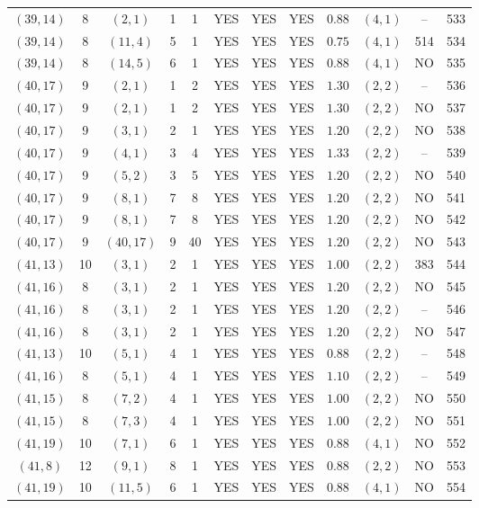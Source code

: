 \begin{longtable}{|c|c|c|c|c|c|c|c|c|c|c|c|}
$(39,14)$ & 8 & $(2,1)$ & 1 & 1 & YES & YES & YES & $0.88$ & $(4,1)$ & -- & 533\\
$(39,14)$ & 8 & $(11,4)$ & 5 & 1 & YES & YES & YES & $0.75$ & $(4,1)$ & 514 & 534\\
$(39,14)$ & 8 & $(14,5)$ & 6 & 1 & YES & YES & YES & $0.88$ & $(4,1)$ & NO & 535\\
$(40,17)$ & 9 & $(2,1)$ & 1 & 2 & YES & YES & YES & $1.30$ & $(2,2)$ & -- & 536\\
$(40,17)$ & 9 & $(2,1)$ & 1 & 2 & YES & YES & YES & $1.30$ & $(2,2)$ & NO & 537\\
$(40,17)$ & 9 & $(3,1)$ & 2 & 1 & YES & YES & YES & $1.20$ & $(2,2)$ & NO & 538\\
$(40,17)$ & 9 & $(4,1)$ & 3 & 4 & YES & YES & YES & $1.33$ & $(2,2)$ & -- & 539\\
$(40,17)$ & 9 & $(5,2)$ & 3 & 5 & YES & YES & YES & $1.20$ & $(2,2)$ & NO & 540\\
$(40,17)$ & 9 & $(8,1)$ & 7 & 8 & YES & YES & YES & $1.20$ & $(2,2)$ & NO & 541\\
$(40,17)$ & 9 & $(8,1)$ & 7 & 8 & YES & YES & YES & $1.20$ & $(2,2)$ & NO & 542\\
$(40,17)$ & 9 & $(40,17)$ & 9 & 40 & YES & YES & YES & $1.20$ & $(2,2)$ & NO & 543\\
$(41,13)$ & 10 & $(3,1)$ & 2 & 1 & YES & YES & YES & $1.00$ & $(2,2)$ & 383 & 544\\
$(41,16)$ & 8 & $(3,1)$ & 2 & 1 & YES & YES & YES & $1.20$ & $(2,2)$ & NO & 545\\
$(41,16)$ & 8 & $(3,1)$ & 2 & 1 & YES & YES & YES & $1.20$ & $(2,2)$ & -- & 546\\
$(41,16)$ & 8 & $(3,1)$ & 2 & 1 & YES & YES & YES & $1.20$ & $(2,2)$ & NO & 547\\
$(41,13)$ & 10 & $(5,1)$ & 4 & 1 & YES & YES & YES & $0.88$ & $(2,2)$ & -- & 548\\
$(41,16)$ & 8 & $(5,1)$ & 4 & 1 & YES & YES & YES & $1.10$ & $(2,2)$ & -- & 549\\
$(41,15)$ & 8 & $(7,2)$ & 4 & 1 & YES & YES & YES & $1.00$ & $(2,2)$ & NO & 550\\
$(41,15)$ & 8 & $(7,3)$ & 4 & 1 & YES & YES & YES & $1.00$ & $(2,2)$ & NO & 551\\
$(41,19)$ & 10 & $(7,1)$ & 6 & 1 & YES & YES & YES & $0.88$ & $(4,1)$ & NO & 552\\
$(41,8)$ & 12 & $(9,1)$ & 8 & 1 & YES & YES & YES & $0.88$ & $(2,2)$ & NO & 553\\
$(41,19)$ & 10 & $(11,5)$ & 6 & 1 & YES & YES & YES & $0.88$ & $(4,1)$ & NO & 554\\

\end{longtable}
